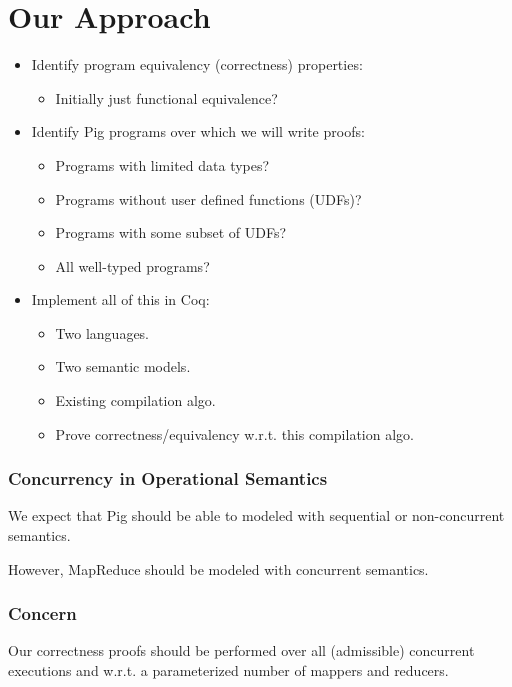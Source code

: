\section{Our Approach}

\begin{frame}
\begin{itemize}
  \frametitle{Stages of Project Development}

  \item Identify program equivalency (correctness) properties:
  \begin{itemize}
    \item Initially just functional equivalence?
  \end{itemize}

  \item Identify Pig programs over which we will write proofs:
  \begin{itemize}
    \item Programs with limited data types?
    \item Programs without user defined functions (UDFs)?
    \item Programs with some subset of UDFs?
    \item All well-typed programs?
  \end{itemize}

  \item Implement all of this in Coq:
  \begin{itemize}
    \item Two languages.
    \item Two semantic models.
    \item Existing compilation algo.
    \item Prove correctness/equivalency w.r.t. this compilation algo.
  \end{itemize}

\end{itemize}
\end{frame}

\begin{frame}
  \frametitle{Concurrency in Operational Semantics}
  We expect that Pig should be able to modeled with sequential or non-concurrent
  semantics.

  However, MapReduce should be modeled with concurrent semantics.
\end{frame}

\begin{frame}
  \frametitle{Concern}
  Our correctness proofs should be performed over all (admissible) concurrent
  executions and w.r.t. a parameterized number of mappers and reducers.
\end{frame}

